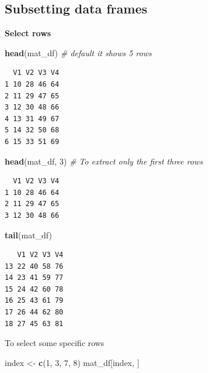 \documentclass[
]{book}
\newenvironment{Shaded}{\begin{snugshade}}{\end{snugshade}}
\newcommand{\CommentTok}[1]{\textcolor[rgb]{0.56,0.35,0.01}{\textit{#1}}}
\newcommand{\DecValTok}[1]{\textcolor[rgb]{0.00,0.00,0.81}{#1}}
\newcommand{\KeywordTok}[1]{\textcolor[rgb]{0.13,0.29,0.53}{\textbf{#1}}}
\newcommand{\NormalTok}[1]{#1}
\newcommand{\StringTok}[1]{\textcolor[rgb]{0.31,0.60,0.02}{#1}}
\begin{document}
\hypertarget{subsetting-data-frames}{%
\subsection{Subsetting data frames}\label{subsetting-data-frames}}

\textbf{Select rows}

\begin{Shaded}
\begin{Highlighting}[]
\KeywordTok{head}\NormalTok{(mat_df) }\CommentTok{# default it shows 5 rows}
\end{Highlighting}
\end{Shaded}

\begin{verbatim}
  V1 V2 V3 V4
1 10 28 46 64
2 11 29 47 65
3 12 30 48 66
4 13 31 49 67
5 14 32 50 68
6 15 33 51 69
\end{verbatim}

\begin{Shaded}
\begin{Highlighting}[]
\KeywordTok{head}\NormalTok{(mat_df, }\DecValTok{3}\NormalTok{) }\CommentTok{# To extract only the first three rows }
\end{Highlighting}
\end{Shaded}

\begin{verbatim}
  V1 V2 V3 V4
1 10 28 46 64
2 11 29 47 65
3 12 30 48 66
\end{verbatim}

\begin{Shaded}
\begin{Highlighting}[]
\KeywordTok{tail}\NormalTok{(mat_df)}
\end{Highlighting}
\end{Shaded}

\begin{verbatim}
   V1 V2 V3 V4
13 22 40 58 76
14 23 41 59 77
15 24 42 60 78
16 25 43 61 79
17 26 44 62 80
18 27 45 63 81
\end{verbatim}

To select some specific rows

\begin{Shaded}
\begin{Highlighting}[]
\NormalTok{index <-}\StringTok{ }\KeywordTok{c}\NormalTok{(}\DecValTok{1}\NormalTok{, }\DecValTok{3}\NormalTok{, }\DecValTok{7}\NormalTok{, }\DecValTok{8}\NormalTok{)}
\NormalTok{mat_df[index, ]}
\end{Highlighting}
\end{Shaded}
\end{document}
